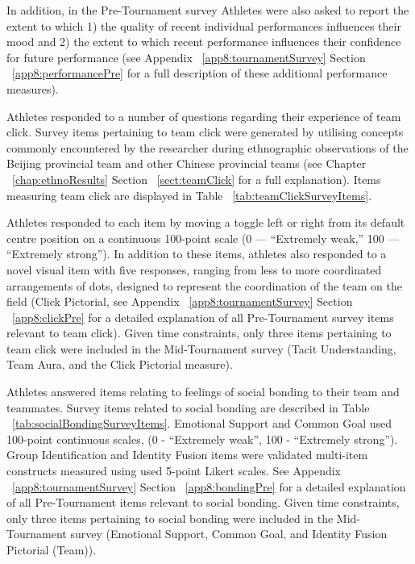 \begin{CJK}{UTF8}{gbsn}
In addition, in the Pre-Tournament survey Athletes were also asked to report the extent to which 1) the quality of recent individual performances influences their mood and 2) the extent to which recent performance influences their confidence for future performance (see Appendix ~\ref{app8:tournamentSurvey} Section ~\ref{app8:performancePre} for a full description of these additional performance measures).

Athletes responded to a number of questions regarding their experience of team click.  Survey items pertaining to team click were generated by utilising concepts commonly encountered by the researcher during ethnographic observations of the Beijing provincial team and other Chinese provincial teams (see Chapter ~\ref{chap:ethnoResults} Section ~\ref{sect:teamClick} for a full explanation).  Items measuring team click are displayed in Table ~\ref{tab:teamClickSurveyItems}.



Athletes responded to each item by moving a toggle left or right from its default centre position on a continuous 100-point scale (0 --- ``Extremely weak,'' 100 --- ``Extremely strong''). In addition to these items, athletes also responded to a novel visual item with five responses, ranging from less to more coordinated arrangements of dots, designed to represent the coordination of the team on the field (Click Pictorial, see Appendix ~\ref{app8:tournamentSurvey} Section ~\ref{app8:clickPre} for a detailed explanation of all Pre-Tournament survey items relevant to team click).  Given time constraints, only three items pertaining to team click were included in the Mid-Tournament survey (Tacit Understanding, Team Aura, and the Click Pictorial measure).


Athletes answered items relating to feelings of social bonding to their team and teammates.  Survey items related to social bonding are described in Table ~\ref{tab:socialBondingSurveyItems}.  Emotional Support and Common Goal used 100-point continuous scales, (0 - ``Extremely weak'', 100 - ``Extremely strong'').  Group Identification and Identity Fusion items were validated multi-item constructs measured using used 5-point Likert scales.  See Appendix ~\ref{app8:tournamentSurvey} Section ~\ref{app8:bondingPre} for a detailed explanation of all Pre-Tournament items relevant to social bonding.  Given time constraints, only three items pertaining to social bonding were included in the Mid-Tournament survey (Emotional Support, Common Goal, and Identity Fusion Pictorial (Team)).


\end{CJK}

